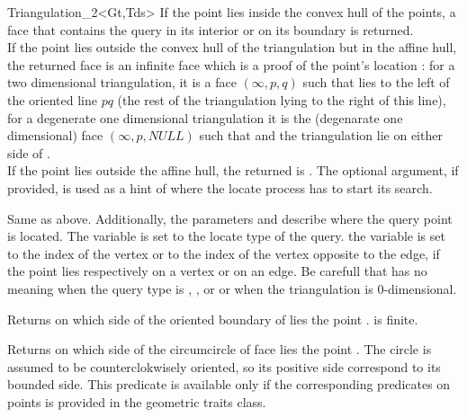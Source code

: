 \begin{ccClassTemplate}{Triangulation_2<Gt,Tds>}
{If the point  lies inside the convex hull of the points, a face 
that contains the query in its interior or on its
 boundary is returned.\\
If the point  lies outside the convex hull of the
triangulation but in the affine hull,
the returned face is an infinite face which is a proof of the point's
location :
for a two dimensional triangulation, it is a face $(\infty, p, q)$ 
such that
 lies to the left  of the oriented line $pq$ 
(the rest of the triangulation lying to the right of this line),
for a degenerate one dimensional triangulation it is the (degenarate
one dimensional) face $(\infty, p, NULL)$ such that 
and the triangulation lie on either side of . \\
If the point  lies outside the affine hull,
the returned  is . 
The optional  argument, if provided, is used as a hint
of where the locate process has to start its search.}

{Same as above. Additionally, the parameters 
 and 
describe where the query point is located. 
The variable  is set to the locate type of the query.
the variable 
is set to the index of the vertex or to the index 
of the vertex opposite to the
edge, if the point lies respectively on a vertex or on an edge. 
Be carefull that 
has no meaning when the query type is , , 
or  or when the
triangulation is $0$-dimensional.}

{Returns on which side of the oriented boundary of  lies 
the point . \ccPrecond {} is finite.}

{Returns on which side of the circumcircle  of face  lies 
the point . The circle is assumed to be counterclokwisely
oriented, so its positive
side correspond to its bounded side.
This predicate is available only if the corresponding predicates on
points is provided in the geometric traits class.}


\end{ccClassTemplate}

